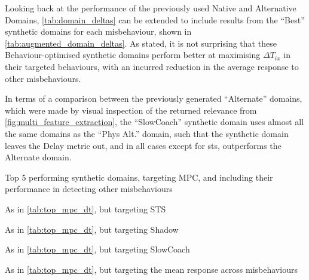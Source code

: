 Looking back at the performance of the previously used Native and Alternative Domains, \autoref{tab:domain_deltas} can be extended to include results from the ``Best'' synthetic domains for each misbehaviour, shown in \autoref{tab:augmented_domain_deltas}.
As stated, it is not surprising that these Behaviour-optimised synthetic domains perform better at maximising $\Delta T_{ix}$ in their targeted behaviours, with an incurred reduction in the average response to other misbehaviours. 

In terms of a comparison between the previously generated ``Alternate'' domains, which were made by visual inspection of the returned relevance from \autoref{fig:multi_feature_extraction}, the ``SlowCoach'' synthetic domain uses almost all the same domains as the ``Phys Alt.'' domain, such that the synthetic domain leaves the Delay metric out, and in all cases except for \gls{sts}, outperforms the Alternate domain.


\begin{table}
	\centering
	\caption{Top 5 performing synthetic domains, targeting MPC, and including their performance in detecting other misbehaviours}
	\centerline{}
	\label{tab:top_mpc_dt}
\end{table}
\begin{table}
	\centering
	\caption{As in \autoref{tab:top_mpc_dt}, but targeting STS}
	\centerline{}
	\label{tab:top_sts_dt}
\end{table}
\begin{table}
	\centering
	\caption{As in \autoref{tab:top_mpc_dt}, but targeting Shadow}
	\centerline{}
	\label{tab:top_shadow_dt}
\end{table}
\begin{table}
	\centering
	\caption{As in \autoref{tab:top_mpc_dt}, but targeting SlowCoach}
	\centerline{}
	\label{tab:top_slowcoach_dt}
\end{table}
\begin{table}
	\centering
	\caption{As in \autoref{tab:top_mpc_dt}, but targeting the mean response across misbehaviours}
	\centerline{}
	\label{tab:top_mean_dt}
\end{table}


